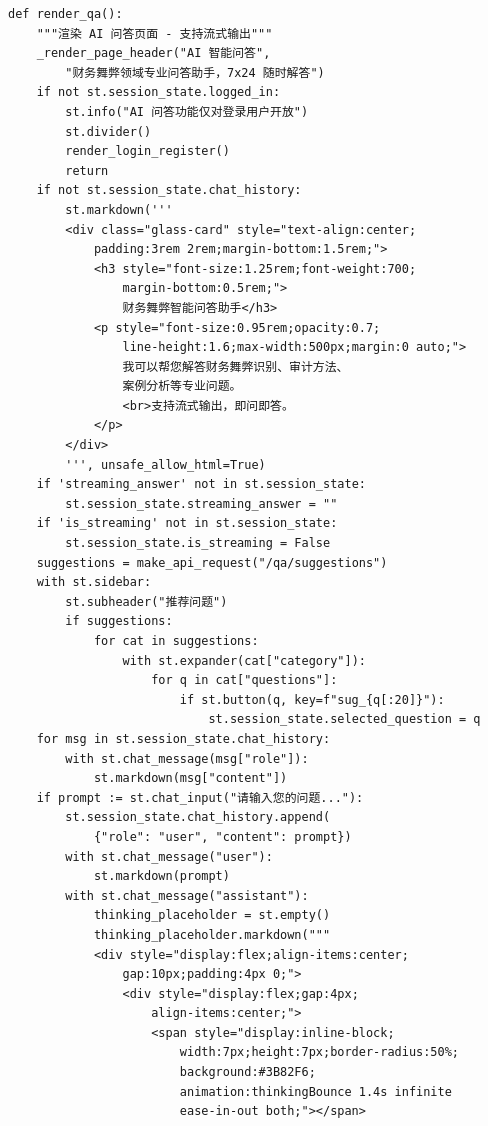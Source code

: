 \documentclass[a4paper,10pt]{article}
\begin{document}
\begin{lstlisting}
def render_qa():
    """渲染 AI 问答页面 - 支持流式输出"""
    _render_page_header("AI 智能问答",
        "财务舞弊领域专业问答助手，7x24 随时解答")
    if not st.session_state.logged_in:
        st.info("AI 问答功能仅对登录用户开放")
        st.divider()
        render_login_register()
        return
    if not st.session_state.chat_history:
        st.markdown('''
        <div class="glass-card" style="text-align:center;
            padding:3rem 2rem;margin-bottom:1.5rem;">
            <h3 style="font-size:1.25rem;font-weight:700;
                margin-bottom:0.5rem;">
                财务舞弊智能问答助手</h3>
            <p style="font-size:0.95rem;opacity:0.7;
                line-height:1.6;max-width:500px;margin:0 auto;">
                我可以帮您解答财务舞弊识别、审计方法、
                案例分析等专业问题。
                <br>支持流式输出，即问即答。
            </p>
        </div>
        ''', unsafe_allow_html=True)
    if 'streaming_answer' not in st.session_state:
        st.session_state.streaming_answer = ""
    if 'is_streaming' not in st.session_state:
        st.session_state.is_streaming = False
    suggestions = make_api_request("/qa/suggestions")
    with st.sidebar:
        st.subheader("推荐问题")
        if suggestions:
            for cat in suggestions:
                with st.expander(cat["category"]):
                    for q in cat["questions"]:
                        if st.button(q, key=f"sug_{q[:20]}"):
                            st.session_state.selected_question = q
    for msg in st.session_state.chat_history:
        with st.chat_message(msg["role"]):
            st.markdown(msg["content"])
    if prompt := st.chat_input("请输入您的问题..."):
        st.session_state.chat_history.append(
            {"role": "user", "content": prompt})
        with st.chat_message("user"):
            st.markdown(prompt)
        with st.chat_message("assistant"):
            thinking_placeholder = st.empty()
            thinking_placeholder.markdown("""
            <div style="display:flex;align-items:center;
                gap:10px;padding:4px 0;">
                <div style="display:flex;gap:4px;
                    align-items:center;">
                    <span style="display:inline-block;
                        width:7px;height:7px;border-radius:50%;
                        background:#3B82F6;
                        animation:thinkingBounce 1.4s infinite
                        ease-in-out both;"></span>

\end{lstlisting}
\end{document}
